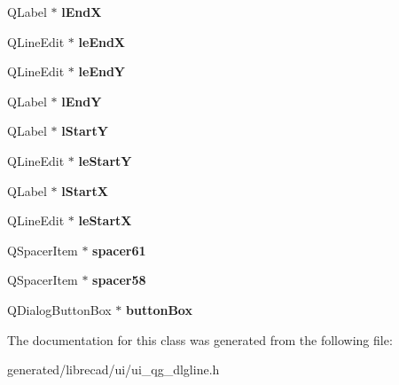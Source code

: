 \begin{DoxyCompactItemize}
\item 
\hypertarget{classUi__QG__DlgLine_aca160e8cc5855dfc1c7a2881cbf75b55}{Q\-Label $\ast$ {\bfseries l\-End\-X}}\label{classUi__QG__DlgLine_aca160e8cc5855dfc1c7a2881cbf75b55}

\item 
\hypertarget{classUi__QG__DlgLine_af7f76796a1f4cde4a9adbc81c9a443da}{Q\-Line\-Edit $\ast$ {\bfseries le\-End\-X}}\label{classUi__QG__DlgLine_af7f76796a1f4cde4a9adbc81c9a443da}

\item 
\hypertarget{classUi__QG__DlgLine_a35b7631037c3660fa876e8bb88cc695c}{Q\-Line\-Edit $\ast$ {\bfseries le\-End\-Y}}\label{classUi__QG__DlgLine_a35b7631037c3660fa876e8bb88cc695c}

\item 
\hypertarget{classUi__QG__DlgLine_a03730a7ed546e802310e212c6b8cb29c}{Q\-Label $\ast$ {\bfseries l\-End\-Y}}\label{classUi__QG__DlgLine_a03730a7ed546e802310e212c6b8cb29c}

\item 
\hypertarget{classUi__QG__DlgLine_a9b49e82a54bcc9b408972a6395900d34}{Q\-Label $\ast$ {\bfseries l\-Start\-Y}}\label{classUi__QG__DlgLine_a9b49e82a54bcc9b408972a6395900d34}

\item 
\hypertarget{classUi__QG__DlgLine_a9e826edd59a60c8c77db4fc1bdda7218}{Q\-Line\-Edit $\ast$ {\bfseries le\-Start\-Y}}\label{classUi__QG__DlgLine_a9e826edd59a60c8c77db4fc1bdda7218}

\item 
\hypertarget{classUi__QG__DlgLine_a0aa6fb76c1655c84720fa79ee3a26945}{Q\-Label $\ast$ {\bfseries l\-Start\-X}}\label{classUi__QG__DlgLine_a0aa6fb76c1655c84720fa79ee3a26945}

\item 
\hypertarget{classUi__QG__DlgLine_a0cb0f6227b16445d7c93eedf6c67faa5}{Q\-Line\-Edit $\ast$ {\bfseries le\-Start\-X}}\label{classUi__QG__DlgLine_a0cb0f6227b16445d7c93eedf6c67faa5}

\item 
\hypertarget{classUi__QG__DlgLine_a428eeff7f056c256ff6cdc9211e2329a}{Q\-Spacer\-Item $\ast$ {\bfseries spacer61}}\label{classUi__QG__DlgLine_a428eeff7f056c256ff6cdc9211e2329a}

\item 
\hypertarget{classUi__QG__DlgLine_aec45bd908ecd96f16a71fa35c567a3f0}{Q\-Spacer\-Item $\ast$ {\bfseries spacer58}}\label{classUi__QG__DlgLine_aec45bd908ecd96f16a71fa35c567a3f0}

\item 
\hypertarget{classUi__QG__DlgLine_af6f17e1a55fad67958d2058115a636ce}{Q\-Dialog\-Button\-Box $\ast$ {\bfseries button\-Box}}\label{classUi__QG__DlgLine_af6f17e1a55fad67958d2058115a636ce}

\end{DoxyCompactItemize}


The documentation for this class was generated from the following file\-:\begin{DoxyCompactItemize}
\item 
generated/librecad/ui/ui\-\_\-qg\-\_\-dlgline.\-h\end{DoxyCompactItemize}
